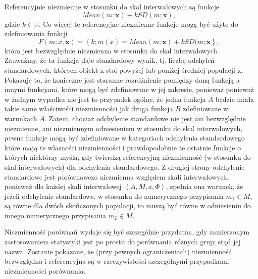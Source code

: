 \documentclass[12pt,a4paper]{report}
\newcommand{\zbior}[1]{\left\lbrace {#1} \right\rbrace }
\newcommand{\tuple}[1]{\left\langle {#1} \right\rangle}
\begin{document}
Referencyjnie niezmienne w stosunku do skal interwałowych są funkcje
\begin{equation*}
Mean(m;\textbf{x})+kSD(m;\textbf{x}),
\end{equation*}
gdzie $k\in \mathbb{R}$. Co więcej te referencyjne niezmienne funkcje mogą być użyte do zdefiniowania funkcji
\begin{equation*}
F(m;x, \textbf{x})=\zbior{k;m(x) = Mean(m;\textbf{x})+kSD(m;\textbf{x}},
\end{equation*}
która jest bezwzględnie niezmienna w stosunku do skal interwałowych. Zauważmy, że ta funkcja daje standardowy wynik, tj. liczbę odchyleń standardowych, których obiekt x stoi powyżej lub poniżej średniej populacji x. Pokazuje to, że konieczne jest staranne rozróżnienie pomiędzy daną funkcją a innymi funkcjami, które mogą być zdefiniowane w jej zakresie, ponieważ ponieważ w żadnym wypadku nie jest to przypadek ogólny, że jedna funkcja $A$ będzie miała takie same właściwości niezmienności jak druga funkcja $B$ zdefiniowane w warunkach $A$. Zatem, chociaż odchylenie standardowe nie jest ani bezwzględnie niezmienne, ani niezmiennym odniesieniem w stosunku do skal interwałowych, pewne funkcje mogą być zdefiniowane w kategoriach odchylenia standardowego które mają te własności niezmienności i prawdopodobnie te ostatnie funkcje o których niektórzy myślą, gdy twierdzą referencyjną niezmienność (w stosunku do skal interwałowych) dla odchylenia standardowego.
Z drugiej strony odchylenie standardowe jest porównawczo niezmienna względem skali interwałowych, ponieważ dla każdej skali interwałowej $\tuple{A,M,a,\Phi}$, spełnia ona warunek, że jeżeli odchylenie standardowe, w stosunku do numerycznego przypisania $m_{1} \in M$, są równe dla dwóch skończonych populacji, to muszą być równe w odniesieniu do innego numerycznego przypisania $m_{2} \in M$.

Niezmienność porównań wydaje się być szczególnie przydatna, gdy zamierzonym zastosowaniem statystyki jest po prostu do porównania różnych grup; stąd jej nazwa. Zostanie pokazane, że (przy pewnych ograniczeniach) niezmienność bezwzględna i referencyjna są w rzeczywistości szczególnymi przypadkami niezmienności porównania.
\end{document}
